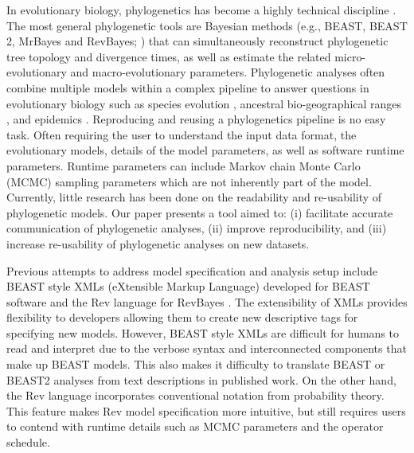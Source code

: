 \documentclass[10pt,letterpaper,table]{article}
\begin{document}
In evolutionary biology, phylogenetics has become a highly technical discipline \cite{oakley2014osiris}. 
The most general phylogenetic tools are Bayesian methods (e.g., BEAST, BEAST 2, MrBayes and
RevBayes; \cite{beast,beast2,revbayes,mrbayes}) 
that can simultaneously reconstruct phylogenetic tree topology and divergence times, as well as estimate the related micro-evolutionary and macro-evolutionary parameters. 
Phylogenetic analyses often combine 
multiple models within a complex pipeline to answer questions in evolutionary biology such as species evolution \cite{gavryushkina17,ogilvie21,zhang21}, ancestral bio-geographical ranges \cite{lemey10,landis18}, and 
epidemics \cite{faria21,douglas21}. 
Reproducing and reusing a phylogenetics pipeline is no easy task. 
Often requiring the user to understand the input data format, the evolutionary models, details of the model parameters, as well as software runtime parameters. 
Runtime parameters can include Markov chain Monte Carlo (MCMC) sampling parameters which are not inherently part of the model.
Currently, little research has been done on the readability and re-usability of phylogenetic models. 
Our paper presents a tool aimed to: (i) facilitate accurate communication of phylogenetic analyses, (ii) improve reproducibility, and (iii) increase re-usability of phylogenetic analyses on new datasets. 
 
Previous attempts to address model specification and analysis setup include BEAST style XMLs (eXtensible Markup Language) developed for BEAST software \cite{beast,beast2} and the Rev language for RevBayes \cite{revbayes}. 
The extensibility of XMLs provides flexibility to developers allowing them to create new
descriptive tags for specifying new models.
However, BEAST style XMLs are difficult for humans to read and interpret due to the verbose syntax and interconnected components that make up BEAST models. 
This also makes it difficulty to translate BEAST or BEAST2 analyses from text descriptions in published work. 
On the other hand, the Rev language 
\cite{revbayes} 
incorporates conventional notation from probability theory. 
This feature makes Rev model specification more intuitive, but still requires users to contend with runtime 
details %
such as MCMC parameters and the operator schedule.
\end{document}
